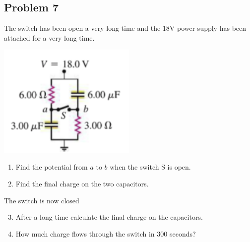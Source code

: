 \subsection*{Problem 7}
The switch has been open a very long time and the 18V power supply has been attached for a very
long time.\\
\centerline{\includegraphics[width=0.5\textwidth]{Images/P7img1.png}}
\begin{enumerate}
    \item Find the potential from $a$ to $b$ when the switch S is open.
    \item Find the final charge on the two capacitors.
\end{enumerate}
The switch is now closed
\begin{enumerate}
    \setcounter{enumi}{2}
    \item After a long time calculate the final charge on the capacitors.
    \item How much charge flows through the switch in 300 seconds?
\end{enumerate}